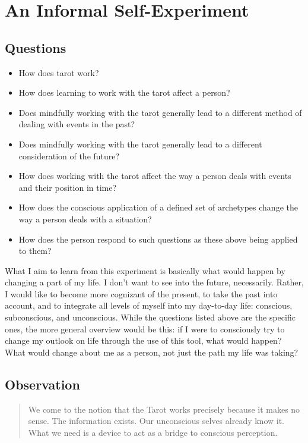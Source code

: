 \documentclass{article}
\begin{document}
\section{An Informal Self-Experiment}

\subsection{Questions}
\begin{itemize}
	\item How does tarot work?
	\item How does learning to work with the tarot affect a person?
	\item Does mindfully working with the tarot generally lead to a different method of dealing with events in the past?
	\item Does mindfully working with the tarot generally lead to a different consideration of the future?
	\item How does working with the tarot affect the way a person deals with events and their position in time?
	\item How does the conscious application of a defined set of archetypes change the way a person deals with a situation?
	\item How does the person respond to such questions as these above being applied to them?
\end{itemize}

What I aim to learn from this experiment is basically what would happen
by changing a part of my life.  I don't want to see into the future,
necessarily.  Rather, I would like to become more cognizant of the
present, to take the past into account, and to integrate all levels of
myself into my day-to-day life: conscious, subconscious, and
unconscious.  While the questions listed above are the specific ones,
the more general overview would be this: if I were to consciously try to
change my outlook on life through the use of this tool, what would
happen?  What would change about me as a person, not just the path my
life was taking?

\subsection{Observation}
\begin{quote}
We come to the notion that the Tarot works precisely because it makes no
sense.  The information exists.  Our unconscious selves already know it.
What we need is a device to act as a bridge to conscious perception.
\cite{pollack97}
\end{quote}
\end{document}
